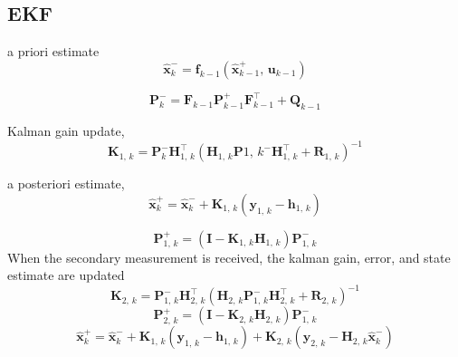 \documentclass{ieeeaccess}
\begin{document}
\subsection{EKF}

	a priori estimate
	\begin{equation}
	\label{eq:x-}
		\hat{\boldsymbol{x}}_{k}^{-}=\boldsymbol{f}_{k-1}\left(\hat{\boldsymbol{x}}^{+}_{k-1},\,\boldsymbol{u}_{k-1}\right)
	\end{equation}
	
	\begin{equation}
	\label{eq:P+}
		\boldsymbol{P}_{k}^{-} = \boldsymbol{F}_{k-1}\boldsymbol{P}_{k-1}^{+}\boldsymbol{F}_{k-1}^{\top} + \boldsymbol{Q}_{k-1}
	\end{equation}
	
	Kalman gain update,
	\begin{equation}
	\label{eq:K}
		\boldsymbol{K}_{1,\,k} = \boldsymbol{P}_{k}^{-}\boldsymbol{H}_{1,\,k}^{\top}\left(\boldsymbol{H}_{1,\,k}\boldsymbol{P}{1,\,k}^{-}\boldsymbol{H}_{1,\,k}^{\top} + \boldsymbol{R}_{1,\,k} \right)^{-1}
	\end{equation}
	
	a posteriori estimate,
	\begin{equation}
	\label{eq:x+}
		\hat{\boldsymbol{x}}_{k}^{+}=\hat{\boldsymbol{x}}_{k}^{-} + \boldsymbol{K}_{1,\,k}\left(\boldsymbol{y}_{1,\,k}- \boldsymbol{h}_{1,\,k}\right)
	\end{equation}
	
	\begin{equation}
	\label{eq:p+}
		\boldsymbol{P}_{1,\,k}^{+} = \left(\boldsymbol{I} - \boldsymbol{K}_{1,\,k}\boldsymbol{H}_{1,\,k}\right)\boldsymbol{P}_{1,\,k}^{-}
	\end{equation}
	When the secondary measurement is received, the kalman gain, error, and state estimate are updated
	\begin{equation}
	\label{eq:K2}
		\boldsymbol{K}_{2,\,k} = \boldsymbol{P}_{1,\,k}^{-}\boldsymbol{H}_{2,\,k}^{\top}\left(\boldsymbol{H}_{2,\,k}\boldsymbol{P}_{1,\,k}^{-}\boldsymbol{H}_{2,\,k}^{\top} + \boldsymbol{R}_{2,\,k} \right)^{-1}
	\end{equation}
	\begin{equation}
	\label{eq:p2+}
		\boldsymbol{P}_{2,\,k}^{+} = \left(\boldsymbol{I} - \boldsymbol{K}_{2,\,k}\boldsymbol{H}_{2,\,k}\right)\boldsymbol{P}_{1,\,k}^{-}
	\end{equation}
	\begin{equation}
	\label{eq:x+}
		\hat{\boldsymbol{x}}_{k}^{+}=\hat{\boldsymbol{x}}_{k}^{-} + \boldsymbol{K}_{1,\,k}\left(\boldsymbol{y}_{1,\,k}- \boldsymbol{h}_{1,\,k}\right) + \boldsymbol{K}_{2,\,k}\left(\boldsymbol{y}_{2,\,k}-\boldsymbol{H}_{2,\,k}\hat{\boldsymbol{x}}_{k}^{-}\right)
	\end{equation}
\end{document}
